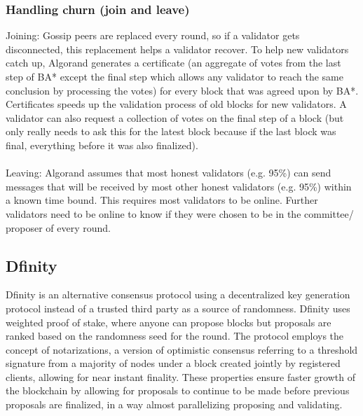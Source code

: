 \documentclass[10pt,journal,compsoc]{IEEEtran}
\begin{document}
\subsubsection{Handling churn (join and leave)}
Joining: Gossip peers are replaced every round, so if a validator gets disconnected, this replacement helps a validator recover. To help new validators catch up, Algorand generates a certificate (an aggregate of votes from the last step of BA* except the final step which allows any validator to reach the same conclusion by processing the votes) for every block that was agreed upon by BA*. Certificates speeds up the validation process of old blocks for new validators. A validator can also request a collection of votes on the final step of a block (but only really needs to ask this for the latest block because if the last block was final, everything before it was also finalized).
\\\\
Leaving: Algorand assumes that most honest validators (e.g. 95\%) can send messages that will be received by most other honest validators (e.g. 95\%) within a known time bound. This requires most validators to be online. Further validators need to be online to know if they were chosen to be in the committee/ proposer of every round.

\subsection{Dfinity}

Dfinity \cite{Dfinity} is an alternative consensus protocol using a decentralized key generation protocol instead of a trusted third party as a source of randomness. Dfinity uses weighted proof of stake, where anyone can propose blocks but proposals are ranked based on the randomness seed for the round. The protocol employs the concept of notarizations, a version of optimistic consensus referring to a threshold signature from a majority of nodes under a block created jointly by registered clients, allowing for near instant finality. These properties ensure faster growth of the blockchain by allowing for proposals to continue to be made before previous proposals are finalized, in a way almost parallelizing proposing and validating. 
\end{document}
